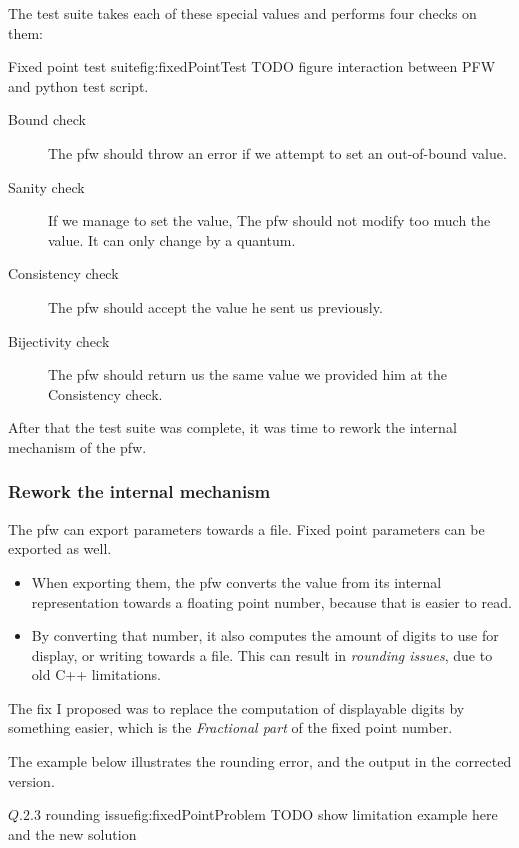 The test suite takes each of these special values and performs four checks on
them:

\begin{figureGraphics}{Fixed point test suite}{fig:fixedPointTest}
    TODO figure interaction between PFW and \gls{python} test script.
\end{figureGraphics}

\begin{description}
    \item[Bound check] The \gls{pfw} should throw an error if we
        attempt to set an out-of-bound value.
    \item[Sanity check] If we manage to set the value, The \gls{pfw} should not modify too much
        the value. It can only change by a quantum.
    \item[Consistency check] The \gls{pfw} should accept the value he sent us previously.
    \item[Bijectivity check] The \gls{pfw} should return us the same value we provided him at the Consistency check.
\end{description}

After that the test suite was complete, it was time to rework the internal
mechanism of the \gls{pfw}.

\subsubsection{Rework the internal mechanism}
The \gls{pfw} can export parameters towards a file. Fixed
point parameters can be exported as well.
\begin{itemize}
    \item When exporting them, the \gls{pfw} converts the value from
        its internal representation towards a floating point number, because that is
        easier to read.
    \item By converting that number, it also computes the amount of digits
        to use for display, or writing towards a file. This can result in
        \emph{rounding issues}, due to old C++ limitations.
\end{itemize}
The fix I proposed was to replace the computation of displayable digits by something
easier, which is the \emph{Fractional part} of the fixed point number.

The example below illustrates the rounding error, and the output in the corrected version.
\begin{figureGraphics}{$Q.2.3$ rounding issue}{fig:fixedPointProblem}
    TODO show limitation example here and the new solution\\
\end{figureGraphics}


